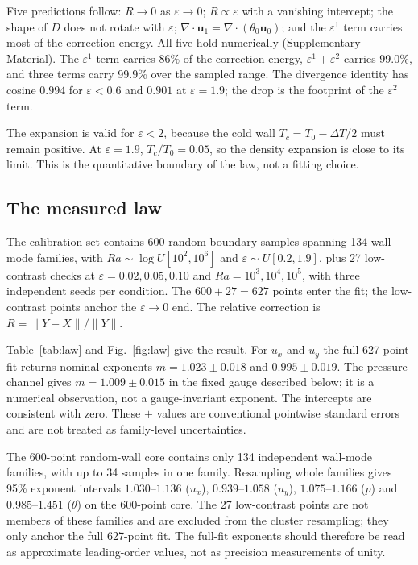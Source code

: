 \documentclass[preprint,11pt,a4paper,times]{elsarticle}
\begin{document}
Five predictions follow: $R\to0$ as $\varepsilon\to0$; $R\propto\varepsilon$ with a vanishing
intercept; the shape of $D$ does not rotate with $\varepsilon$;
$\nabla\cdot\bm u_1=\nabla\cdot(\theta_0\bm u_0)$; and the $\varepsilon^1$ term carries most
of the correction energy. All five hold numerically (Supplementary Material). The
$\varepsilon^1$ term carries 86\% of the correction energy, $\varepsilon^1+\varepsilon^2$
carries 99.0\%, and three terms carry 99.9\% over the sampled range. The divergence identity
has cosine $0.994$ for $\varepsilon<0.6$ and $0.901$ at $\varepsilon=1.9$; the drop is the
footprint of the $\varepsilon^2$ term.

The expansion is valid for $\varepsilon<2$, because the cold wall
$T_c=T_0-\Delta T/2$ must remain positive. At $\varepsilon=1.9$, $T_c/T_0=0.05$, so the
density expansion is close to its limit. This is the quantitative boundary of the law, not a
fitting choice.

\subsection{The measured law}
\label{sec:law}

The calibration set contains 600 random-boundary samples spanning 134 wall-mode families, with
$Ra\sim\log U[10^2,10^6]$ and $\varepsilon\sim U[0.2,1.9]$, plus 27 low-contrast checks at
$\varepsilon=0.02,0.05,0.10$ and $Ra=10^3,10^4,10^5$, with three independent seeds per
condition. The $600+27=627$ points
enter the fit; the low-contrast points anchor the $\varepsilon\to0$ end. The relative
correction is $R=\|Y-X\|/\|Y\|$.

Table~\ref{tab:law} and Fig.~\ref{fig:law} give the result. For $u_x$ and $u_y$ the full
627-point fit returns nominal exponents $m=1.023\pm0.018$ and $0.995\pm0.019$. The pressure
channel gives $m=1.009\pm0.015$ in the fixed gauge described below; it is a numerical
observation, not a gauge-invariant exponent. The intercepts are consistent with zero. These
$\pm$ values are conventional pointwise standard errors and are not treated as family-level
uncertainties.

The 600-point random-wall core contains only 134 independent wall-mode families, with up to
34 samples in one family. Resampling whole families gives 95\% exponent intervals
$1.030$--$1.136$ ($u_x$), $0.939$--$1.058$ ($u_y$), $1.075$--$1.166$ ($p$) and
$0.985$--$1.451$ ($\theta$) on the 600-point core. The 27 low-contrast points are not members
of these families and are excluded from the cluster resampling; they only anchor the full
627-point fit. The full-fit exponents should therefore be read as approximate leading-order
values, not as precision measurements of unity.
\end{document}

